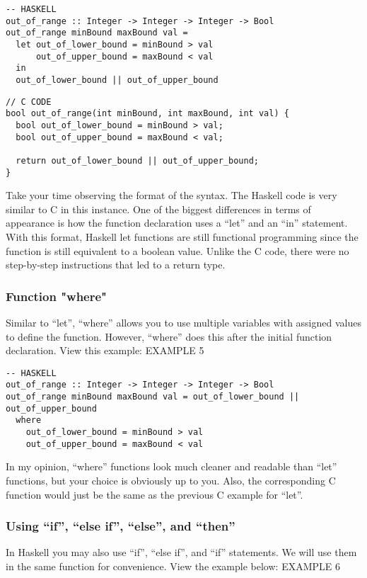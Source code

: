 \documentclass{article}
\begin{document}
\begin{lstlisting}[style=HaskellStyle]
-- HASKELL
out_of_range :: Integer -> Integer -> Integer -> Bool
out_of_range minBound maxBound val =
  let out_of_lower_bound = minBound > val
      out_of_upper_bound = maxBound < val
  in
  out_of_lower_bound || out_of_upper_bound
\end{lstlisting}

\begin{lstlisting}[style=CStyle]
// C CODE
bool out_of_range(int minBound, int maxBound, int val) {
  bool out_of_lower_bound = minBound > val;
  bool out_of_upper_bound = maxBound < val;

  return out_of_lower_bound || out_of_upper_bound;
}
\end{lstlisting}

\medskip\noindent
Take your time observing the format of the syntax. The Haskell code is very similar to C in this instance. One of the biggest differences in terms of appearance is how the function declaration uses a “let” and an “in” statement. With this format, Haskell let functions are still functional programming since the function is still equivalent to a boolean value. Unlike the C code, there were no step-by-step instructions that led to a return type.

\subsubsection{Function "where"}
\medskip\noindent
Similar to “let”, “where” allows you to use multiple variables with assigned values to define the function. However, “where” does this after the initial function declaration. View this example: EXAMPLE 5

\begin{lstlisting}[style=HaskellStyle]
-- HASKELL
out_of_range :: Integer -> Integer -> Integer -> Bool
out_of_range minBound maxBound val = out_of_lower_bound || out_of_upper_bound
  where
    out_of_lower_bound = minBound > val
    out_of_upper_bound = maxBound < val
\end{lstlisting}

\medskip\noindent
In my opinion, “where” functions look much cleaner and readable than “let” functions, but your choice is obviously up to you. Also, the corresponding C function would just be the same as the previous C example for “let”.

\subsubsection{Using “if”, “else if”, “else”, and “then”}
\medskip\noindent
In Haskell you may also use “if”, “else if”, and “if” statements. We will use them in the same function for convenience. View the example below: EXAMPLE 6
\end{document}
